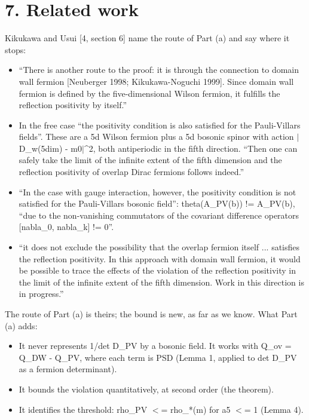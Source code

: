 \documentclass[11pt,a4paper]{article}
\begin{document}
\section*{7. Related work}
Kikukawa and Usui [4, section 6] name the route of Part (a) and say where it stops:

\begin{itemize}
\item{} ``There is another route to the proof: it is through the connection to domain wall fermion [Neuberger 1998; Kikukawa-Noguchi 1999]. Since domain wall fermion is defined by the five-dimensional Wilson fermion, it fulfills the reflection positivity by itself.''
\item{} In the free case ``the positivity condition is also satisfied for the Pauli-Villars fields''. These are a 5d Wilson fermion plus a 5d bosonic spinor with action $|$D\_w(5dim) - m0$|$\textasciicircum{}2, both antiperiodic in the fifth direction. ``Then one can safely take the limit of the infinite extent of the fifth dimension and the reflection positivity of overlap Dirac fermions follows indeed.''
\item{} ``In the case with gauge interaction, however, the positivity condition is not satisfied for the Pauli-Villars bosonic field'': theta(A\_PV(b)) != A\_PV(b), ``due to the non-vanishing commutators of the covariant difference operators [nabla\_0, nabla\_k] != 0''.
\item{} ``it does not exclude the possibility that the overlap fermion itself ... satisfies the reflection positivity. In this approach with domain wall fermion, it would be possible to trace the effects of the violation of the reflection positivity in the limit of the infinite extent of the fifth dimension. Work in this direction is in progress.''
\end{itemize}

The route of Part (a) is theirs; the bound is new, as far as we know. What Part (a) adds:

\begin{itemize}
\item{} It never represents 1/det D\_PV by a bosonic field. It works with Q\_ov = Q\_DW - Q\_PV, where each term is PSD (Lemma 1, applied to det D\_PV as a fermion determinant).
\item{} It bounds the violation quantitatively, at second order (the theorem).
\item{} It identifies the threshold: rho\_PV $<$= rho\_*(m) for a5 $<$= 1 (Lemma 4).
\end{itemize}
\end{document}
